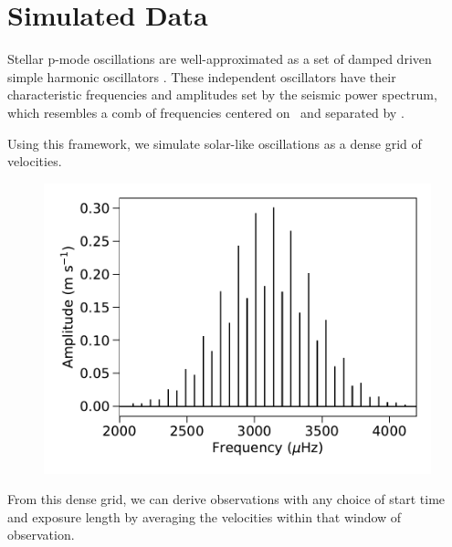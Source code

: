 \documentclass[modern]{aastex62}
\begin{document}
\section{Simulated Data}
\label{s:sim-data}

Stellar p-mode oscillations are well-approximated as a set of damped driven simple harmonic oscillators . 
These independent oscillators have their characteristic frequencies and amplitudes set by the seismic power spectrum, which resembles a comb of frequencies centered on \numax\ and separated by \deltanu.

Using this framework, we simulate solar-like oscillations as a dense grid of velocities. 

\begin{figure}
    \centering
    \includegraphics[width=0.7\linewidth]{paper/figures/sim_freq_spectrum.pdf}
    \caption{}
    \label{fig:sim-freq-spectrum}
\end{figure}

From this dense grid, we can derive \RV observations with any choice of start time and exposure length by averaging the velocities within that window of observation. 





\end{document}
